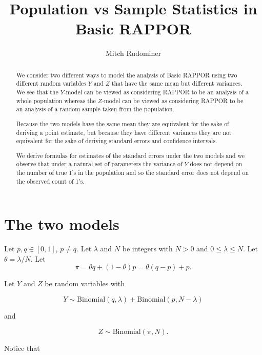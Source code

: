 \documentclass[oneside,12pt]{amsart}
\begin{document}
\title{Population vs Sample Statistics in Basic RAPPOR\vspace{-1cm}}
\author{Mitch Rudominer\vspace{-0.4cm}}
\address{Google}

\begin{abstract}
We consider two different ways to model the analysis of Basic RAPPOR using
two different random variables $Y$ and $Z$ that have the same mean but
different variances. We see that the $Y$-model can be viewed as considering
RAPPOR to be an analysis of a whole population whereas the $Z$-model can
be viewed as considering RAPPOR to be an analysis of a random sample taken
from the population.

Because the two models have the same mean they are
equivalent for the sake of deriving a point estimate, but because they
have different variances they are not equivalent for the sake of deriving
standard errors and confidence intervals.

We derive formulas for estimates of the standard errors under the two
models and we observe that under a natural set of parameters the variance
of $Y$ does not depend on the number of true 1's in the population and so
the standard error does not depend on the observed count of 1's.
\end{abstract}

\maketitle

\tableofcontents


\section{The two models}

Let $p, q \in [0, 1]$, $p\not= q$.
Let $\lambda$ and $N$ be integers with $N>0$ and $0\leq\lambda\leq N$.
Let $\theta=\lambda/N$. Let
$$\pi = \theta q + (1-\theta) p = \theta(q-p) + p.$$

Let $Y$ and $Z$ be random variables with

$$Y\sim\text{Binomial}(q, \lambda) + \text{Binomial}(p, N - \lambda)$$

and

$$Z\sim\text{Binomial}(\pi, N).$$

Notice that
\end{document}
